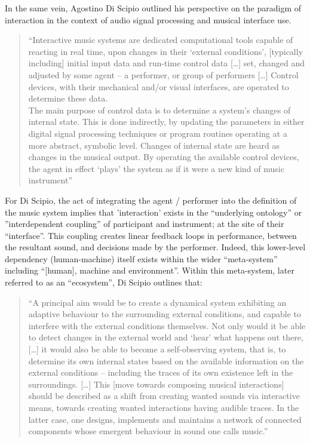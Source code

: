 In the same vein, Agostino Di Scipio outlined his perspective on the paradigm of interaction in the context of audio signal processing and musical interface use.  
\begin{quote}
    “Interactive music systems are dedicated computational tools capable of reacting in real time, upon changes in their ‘external conditions’, [typically including] initial input data and run-time control data […] set, changed and adjusted by some agent – a performer, or group of performers […] Control devices, with their mechanical and/or visual interfaces, are operated to determine these data.\\ 
    The main purpose of control data is to determine a system’s changes of internal state. This is done indirectly, by updating the parameters in either digital signal processing techniques or program routines operating at a more abstract, symbolic level. Changes of internal state are heard as changes in the musical output. By operating the available control devices, the agent in effect ‘plays’ the system as if it were a new kind of music instrument” \citeyearpar[p. 1]{discipio2003}
\end{quote}
For Di Scipio, the act of integrating the agent / performer into the definition of the music system implies that ’interaction’ exists in the “underlying ontology” or ”interdependent coupling” of participant and instrument; at the site of their “interface”. This coupling creates linear feedback loops in performance, between the resultant sound, and decisions made by the performer. Indeed, this lower-level dependency (human-machine) itself exists within the wider “meta-system” including “[human], machine and environment”. Within this meta-system, later referred to as an “ecosystem”, Di Scipio outlines that:
\begin{quote}
    “A principal aim would be to create a dynamical system exhibiting an adaptive behaviour to the surrounding external conditions, and capable to interfere with the external conditions themselves. Not only would it be able to detect changes in the external world and ‘hear’ what happens out there, […] it would also be able to become a self-observing system, that is, to determine its own internal states based on the available information on the external conditions – including the traces of its own existence left in the surroundings. […] This [move towards composing musical interactions] should be described as a shift from creating wanted sounds via interactive means, towards creating wanted interactions having audible traces. In the latter case, one designs, implements and maintains a network of connected components whose emergent behaviour in sound one calls music.” \citeyearpar[p. 6]{discipio2003}
\end{quote}

